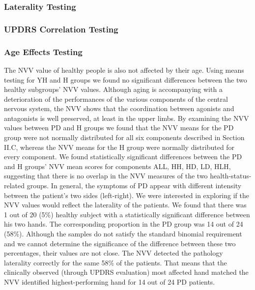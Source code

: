 \subsubsection{Laterality Testing}
\label{subsubsec:PenCTLateralityTesting}

\subsubsection{UPDRS Correlation Testing}
\label{subsubsec:PenCTUPDRSCorTesting}

\subsubsection{Age Effects Testing}
\label{subsubsec:PenCTAgeEffectsTesting}

The NVV value of healthy people is also not affected by their age. Using means testing for YH and H groups we found no significant differences between the two healthy subgroups’ NVV values. Although aging is accompanying with a deterioration of the performances of the various components of the central nervous system, the NVV shows that the coordination between agonists and antagonists is well preserved, at least in the upper limbs.
By examining the NVV values between PD and H groups we found that the NVV means for the PD group were not normally distributed for all six components described in Section II.C, whereas the NVV means for the H group were normally distributed for every component. 
We found statistically significant differences between the PD and H groups’ NVV mean scores for components ALL, HH, HD, LD, HLH, suggesting that there is no overlap in the NVV measures of the two health-status-related groups. 
In general, the symptoms of PD appear with different intensity between the patient’s two sides (left-right). We were interested in exploring if the NVV values would reflect the laterality of the patients. 
We found that there was 1 out of 20 (5\%) healthy subject with a statistically significant difference between his two hands. The corresponding proportion in the PD group was 14 out of 24 (58\%). Although the samples do not satisfy the standard binomial requirement and we cannot determine the significance of the difference between these two percentages, their values are not close. The NVV detected the pathology laterality correctly for the same 58\% of the patients. That means that the clinically observed (through UPDRS evaluation) most affected hand matched the NVV identified highest-performing hand for 14 out of 24 PD patients.
